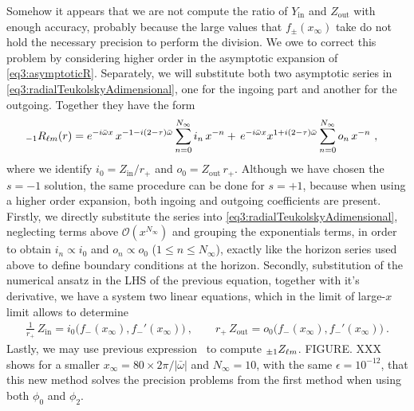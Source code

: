 Somehow it appears that we are not compute the ratio of $Y_\mathrm{in}$ and $Z_\mathrm{out}$ with enough accuracy, probably because the large values that $f_{\pm}(x_\infty)$ take do not hold the necessary precision to perform the division.
We owe to correct this problem by considering higher order in the asymptotic expansion of \eqref{eq3:asymptoticR}.
Separately, we will substitute both two asymptotic series in \eqref{eq3:radialTeukolskyAdimensional}, one for the ingoing part and another for the outgoing.
Together they have the form
\begin{align}
	\label{eq4:radialIOseries}
	\uu[-1]{R}{\ell m}(r) &= e^{-i \bar{\omega} x}  \, x^{ - 1 - i (2-\tau) \bar{\omega} } \sum_{n=0}^{N_\infty} i_n \, x^{-n} + \, e^{-i \bar{\omega} x} x^{ 1 + i (2-\tau) \bar{\omega} } \sum_{n=0}^{N_\infty} o_n \, x^{-n} ~,
\end{align}
where we identify $i_0 = Z_\mathrm{in}/r_{+}$ and $o_0 = Z_\mathrm{out} \,r_{+}$.
Although we have chosen the $s=-1$ solution, the same procedure can be done for $s=+1$, because when using a higher order expansion, both ingoing and outgoing coefficients are present.
Firstly, we directly substitute the series into \eqref{eq3:radialTeukolskyAdimensional}, neglecting terms above $\mathscr{O}(x^{N_\infty})$ and grouping the exponentials terms, in order to obtain $i_n\propto i_0$ and $o_n\propto o_0$ ($1 \le n \le N_\infty$), exactly like the horizon series used above to define boundary conditions at the horizon.
Secondly, substitution of the numerical ansatz  in the LHS of the previous equation, together with it's derivative, we have a system two linear equations, which in the limit of large-$x$ limit allows to determine
\begin{align}
	\frac{1}{r_+} \,Z_\mathrm{in} = i_0\Big( f_{-}(x_\infty),  f_{-}{\!}'(x_\infty) \Big) ~,\qquad r_{+} \,Z_\mathrm{out} = o_0\Big( f_{-}(x_\infty),  f_{-}{\!}'(x_\infty) \Big) ~.
\end{align}
Lastly, we may use previous expression~ to compute $\uu[\pm1]{Z}{\ell m}$.
FIGURE. XXX shows for a smaller $x_\infty = 80 \times 2 \pi / |\bar{\omega}|$ and $N_\infty = 10$, with the same $\epsilon = 10^{-12}$, that this new method solves the precision problems from the first method when using both $\phi_0$ and $\phi_2$. 





\cleardoublepage
